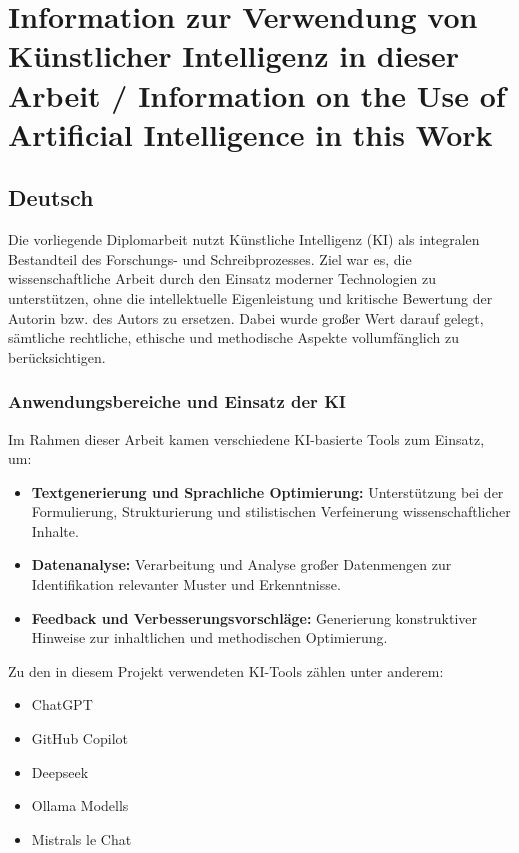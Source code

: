 \chapter{Information zur Verwendung von Künstlicher Intelligenz in dieser Arbeit / Information on the Use of Artificial Intelligence in this Work}
\label{cha:Use-of-AI}

\section*{Deutsch}
Die vorliegende Diplomarbeit nutzt Künstliche Intelligenz (KI) als integralen Bestandteil des Forschungs- und Schreibprozesses. Ziel war es, die wissenschaftliche Arbeit durch den Einsatz moderner Technologien zu unterstützen, ohne die intellektuelle Eigenleistung und kritische Bewertung der Autorin bzw. des Autors zu ersetzen. Dabei wurde großer Wert darauf gelegt, sämtliche rechtliche, ethische und methodische Aspekte vollumfänglich zu berücksichtigen.

\subsection*{Anwendungsbereiche und Einsatz der KI}
Im Rahmen dieser Arbeit kamen verschiedene KI-basierte Tools zum Einsatz, um:
\begin{itemize}
    \item \textbf{Textgenerierung und Sprachliche Optimierung:} Unterstützung bei der Formulierung, Strukturierung und stilistischen Verfeinerung wissenschaftlicher Inhalte. 
    \item \textbf{Datenanalyse:} Verarbeitung und Analyse großer Datenmengen zur Identifikation relevanter Muster und Erkenntnisse.
    \item \textbf{Feedback und Verbesserungsvorschläge:} Generierung konstruktiver Hinweise zur inhaltlichen und methodischen Optimierung.
\end{itemize}
Zu den in diesem Projekt verwendeten KI-Tools zählen unter anderem:
\begin{itemize}
    \item ChatGPT
    \item GitHub Copilot
    \item Deepseek
    \item Ollama Modells
    \item Mistrals le Chat
\end{itemize}

